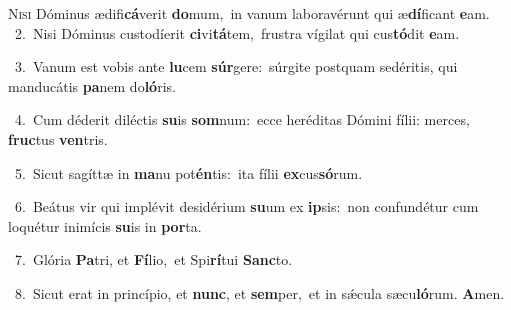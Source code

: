 \lettrine{\initial\textcolor{\initialcolor}{N}}{isi} Dóminus ædifi\-\textbf{cá}\-verit \textbf{do}\-mum,~\star in vanum laboravérunt qui æ\-\textbf{dí}\-ficant \textbf{e}\-am.\\
{\numbfont\textcolor{\numbcolor}{~2.}}~Nisi Dóminus custodíerit \textbf{ci}\-vi\-\textbf{tá}\-tem,~\star frustra vígilat qui cus\-\textbf{tó}\-dit \textbf{e}\-am.\par
{\numbfont\textcolor{\numbcolor}{~3.}}~Vanum est vobis ante \textbf{lu}\-cem \textbf{súr}\-gere:~\star súrgite postquam sedéritis, qui manducátis \textbf{pa}\-nem do\-\textbf{ló}\-ris.\par
{\numbfont\textcolor{\numbcolor}{~4.}}~Cum déderit diléctis \textbf{su}\-is \textbf{som}\-num:~\star ecce heréditas Dómini fílii: merces, \textbf{fruc}\-tus \textbf{ven}\-tris.\par
{\numbfont\textcolor{\numbcolor}{~5.}}~Sicut sagíttæ in \textbf{ma}\-nu pot\-\textbf{én}\-tis:~\star ita fílii \textbf{ex}\-cus\-\textbf{só}\-rum.\par
{\numbfont\textcolor{\numbcolor}{~6.}}~Beátus vir qui implévit desidérium \textbf{su}\-um ex \textbf{ip}\-sis:~\star non confundétur cum loquétur inimícis \textbf{su}\-is in \textbf{por}\-ta.\par
{\numbfont\textcolor{\numbcolor}{~7.}}~Glória \textbf{Pa}\-tri, et \textbf{Fí}\-lio,~\star et Spi\-\textbf{rí}\-tui \textbf{Sanc}\-to.\par
{\numbfont\textcolor{\numbcolor}{~8.}}~Sicut erat in princípio, et \textbf{nunc}\-, et \textbf{sem}\-per,~\star et in sǽcula sæcu\-\textbf{ló}\-rum. \textbf{A}\-men.\par
